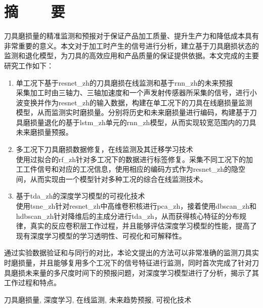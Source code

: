 \renewcommand{\baselinestretch}{1.5}
\fontsize{12pt}{13pt}\selectfont

\chapter[摘要]{摘~~~~要}

刀具磨损量的精准监测和预报对于保证产品加工质量、提升生产力和降低成本具有非常重要的意义。本文对于加工时产生的信号进行分析，建立基于刀具磨损状态的监测和退化模型，为刀具的高效应用和产品质量的保证提供依据。本文完成的主要研究工作如下：

\begin{enumerate}
	\item 单工况下基于\gls{resnet_zh}的刀具磨损在线监测和基于\gls{rnn_zh}的未来预报\\
	采集加工时由三轴力、三轴加速度和一个声发射传感器所采集的信号，进行小波变换并作为\gls{resnet_zh}的输入数据，构建在单工况下的刀具在线磨损量监测模型，从而监测实时磨损量。分别将历史和未来磨损量进行编码，构建基于刀具磨损量退化的基于\gls{lstm_zh}单元的\gls{rnn_zh}模型，从而实现较宽范围内的刀具未来磨损量预报。
	\item 多工况下刀具磨损数据修复，在线监测及其迁移学习技术\\
	使用过拟合的\gls{rf_zh}针对多工况下的数据进行标签修复。采集不同工况下的加工工件信号和对应的工况信息，使用相应的编码方式作为\gls{resnet_zh}的隐空间，从而实现由一个模型针对多种工况的综合在线监测技术。
	\item 基于\gls{tda_zh}的深度学习模型的可视化技术\\
	使用\gls{tsne_zh}针对\gls{resnet_zh}中高维卷积核进行\gls{pca_zh}，接着使用\gls{dbscan_zh}和\gls{hdbscan_zh}针对降维后的主成分进行\gls{tda_zh}，从而获得核心特征的分布规律，真实的反应卷积层工作过程，并且能够评估深度学习模型的性能，提高了现有深度学习模型的学习透明性、可视化和可解释性。
\end{enumerate}

通过实验数据验证和与同行的对比，本论文提出的方法可以非常准确的监测刀具实时磨损量，并且能够复用多个工况下的信号特征进行监测，同时首次完成了针对刀具磨损未来量的多尺度时间下的预报问题，对深度学习模型进行了分析，揭示了其工作过程和特点。
\vspace{-10pt}

\vspace{1em}
 \quad 刀具磨损量, 深度学习, 在线监测, 未来趋势预报, 可视化技术

\clearpage
\endinput